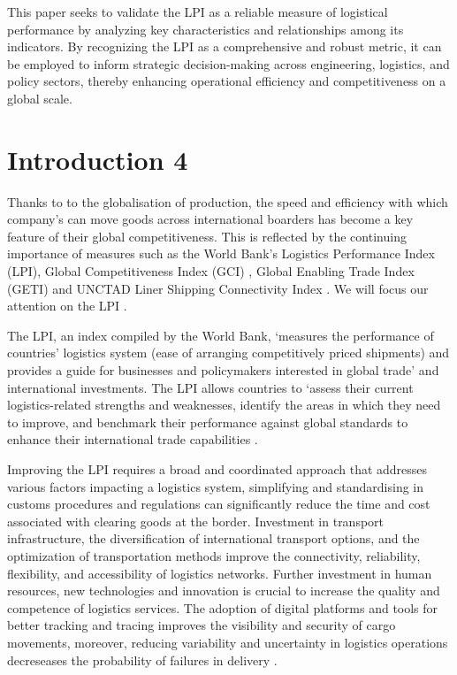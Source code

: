 \documentclass[sigconf]{acmart}
\begin{document}
This paper seeks to validate the LPI as a reliable measure of logistical performance by analyzing key characteristics and relationships among its indicators. By recognizing the LPI as a comprehensive and robust metric, it can be employed to inform strategic decision-making across engineering, logistics, and policy sectors, thereby enhancing operational efficiency and competitiveness on a global scale.

\section{Introduction 4}
Thanks to to the globalisation of production, the speed and efficiency with which company’s can move goods across international boarders has become a key feature of their global competitiveness. This is reflected by the continuing importance of measures such as the World Bank’s Logistics Performance Index (LPI), Global Competitiveness Index (GCI) \cite{wef2020}, Global Enabling Trade Index (GETI) \cite{wef2018} and UNCTAD Liner Shipping Connectivity Index \cite{unctad2020}. We will focus our attention on the LPI \cite{beysenbaev2020}.

The LPI, an index compiled by the World Bank, ‘measures the performance of countries’ logistics system (ease of arranging competitively priced shipments) and provides a guide for businesses and policymakers interested in global trade’ and international investments. The LPI allows countries to ‘assess their current logistics-related strengths and weaknesses, identify the areas in which they need to improve, and benchmark their performance against global standards to enhance their international trade capabilities \cite{beysenbaev2020}.

Improving the LPI requires a broad and coordinated approach that addresses various factors impacting a logistics system, simplifying and standardising in customs procedures and regulations can significantly reduce the time and cost associated with clearing goods at the border. Investment in transport infrastructure, the diversification of international transport options, and the optimization of transportation methods improve the connectivity, reliability, flexibility, and accessibility of logistics networks. Further investment in human resources, new technologies and innovation is crucial to increase the quality and competence of logistics services. The adoption of digital platforms and tools for better tracking and tracing improves the visibility and security of cargo movements, moreover, reducing variability and uncertainty in logistics operations decreseases the probability of failures in delivery \cite{WBreport2018}.
\end{document}
